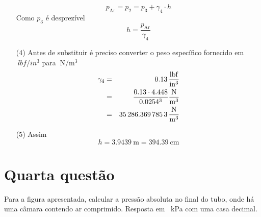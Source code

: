 \documentclass[
	a4paper,
	12pt,
	brazilian
]{article}
\begin{document}
\begin{enumerate}
\begin{center}
		\end{center}
		\begin{equation}
			p_{\textrm{Ar}}=p_{2}=p_{3}+\gamma_{4}\cdot h
		\end{equation}
		Como $p_{3}$ é desprezível
		\begin{equation}
			h=\dfrac{p_{\textrm{Ar}}}{\gamma_{4}}
		\end{equation}
		\item[(4)] Antes de substituir é preciso converter o peso específico fornecido em $\SI{}{lbf/in^{3}}$ para $\SI{}{\newton/\meter^{3}}$
		\begin{eqnarray}
			\gamma_{4}&=&\SI{0.13}{\dfrac{lbf}{in^{3}}}\\
			&=&\dfrac{0.13\cdot 4.448}{0.0254^{3}}\SI{}{\dfrac{\newton}{\meter^{3}}}\\
			&=&\SI{35286.3697853}{\dfrac{\newton}{\meter^{3}}}
		\end{eqnarray}
		\item[(5)] Assim
		\begin{equation}
			h=\SI{3.9439}{\meter}=\SI{394.39}{\centi\meter}
		\end{equation}
	\end{enumerate}
	\section{Quarta questão}
	Para a figura apresentada, calcular a pressão absoluta no final do tubo, onde há uma câmara contendo ar comprimido. Resposta em \SI{}{\kilo\pascal} com uma casa decimal.\\\vspace{.5cm}
	
\end{document}
